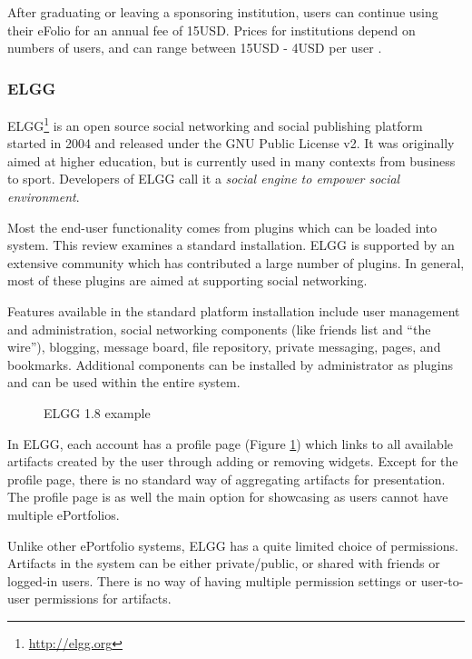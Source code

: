 After graduating or leaving a sponsoring institution, users can continue
using their eFolio for an annual fee of 15USD. Prices for institutions depend
on numbers of users, and can range between 15USD - 4USD per user
\citep{AAEEBL2011}.

\subsubsection{ELGG}
ELGG\footnote{\url{http://elgg.org}} is an open source social networking and
social publishing platform started in 2004 and released under the GNU Public
License v2. It was originally aimed at higher education, but is currently used
in many contexts from business to sport. Developers of ELGG call it a
\textit{social engine to empower social environment}.

Most the end-user functionality comes from plugins which can be loaded into
system. This review examines a standard installation. ELGG is supported by an
extensive community which has contributed a large number of plugins. In
general, most of these plugins are aimed at supporting social networking.

Features available in the standard platform installation include user management
and administration, social networking components (like friends list and ``the
wire''), blogging, message board, file repository, private messaging, pages, and
bookmarks. Additional components can be installed by administrator as plugins
and can be used within the entire system.

\begin{figure}[htb]
\centering
\setlength\fboxsep{0pt}
\setlength\fboxrule{0.5pt}
\caption{ELGG 1.8 example}
\label{fig:elgg}
\end{figure}

In ELGG, each account has a profile page (Figure \ref{fig:elgg}) which links to
all available artifacts created by the user through adding or removing widgets.
Except for the profile page, there is no standard way of aggregating artifacts
for presentation. The profile page is as well the main option for showcasing as
users cannot have multiple ePortfolios.

Unlike other ePortfolio systems, ELGG has a quite limited choice of permissions.
Artifacts in the system can be either private/public, or shared with friends
or logged-in users. There is no way of having multiple permission settings or
user-to-user permissions for artifacts.

